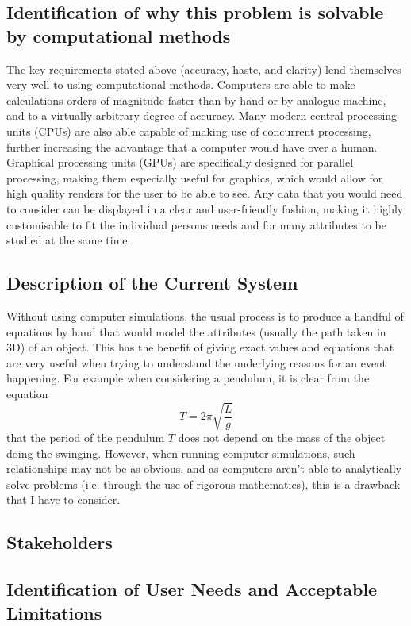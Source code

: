 \documentclass[11pt]{article}
\begin{document}
        \subsection{Identification of why this problem is solvable by computational methods}
            The key requirements stated above (accuracy, haste, and clarity) lend themselves very well to using computational methods. Computers are able to make calculations orders of magnitude faster than by hand or by analogue machine, and to a virtually arbitrary degree of accuracy. Many modern central processing units (CPUs) are also able capable of making use of concurrent processing, further increasing the advantage that a computer would have over a human. Graphical processing units (GPUs) are specifically designed for parallel processing, making them especially useful for graphics, which would allow for high quality renders for the user to be able to see. Any data that you would need to consider can be displayed in a clear and user-friendly fashion, making it highly customisable to fit the individual persons needs and for many attributes to be studied at the same time.

        \subsection{Description of the Current System}
            Without using computer simulations, the usual process is to produce a handful of equations by hand that would model the attributes (usually the path taken in 3D) of an object. This has the benefit of giving exact values and equations that are very useful when trying to understand the underlying reasons for an event happening. For example when considering a pendulum, it is clear from the equation $$ T = 2 \pi \sqrt{\frac{L}{g}} $$ that the period of the pendulum $T$ does not depend on the mass of the object doing the swinging. However, when running computer simulations, such relationships may not be as obvious, and as computers aren't able to analytically solve problems (i.e. through the use of rigorous mathematics), this is a drawback that I have to consider.
            

        \subsection{Stakeholders}
        \subsection{Identification of User Needs and Acceptable Limitations}
\end{document}
